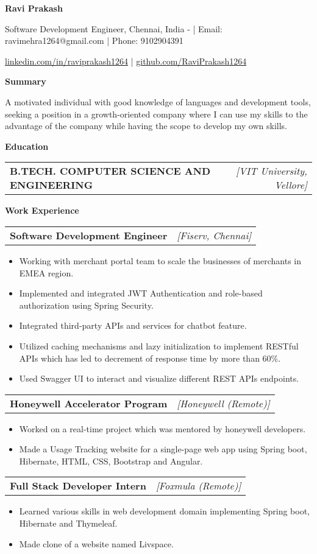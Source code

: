 \documentclass[a4paper,10pt]{article}
\makeatletter
\newcommand{\resitem}[1]{\item #1}
\newcommand{\resheading}[1]{\vspace{0.5em} {\small \colorbox{mygrey}{{\begin{minipage}{0.975\textwidth}{{\textbf{#1}}}\end{minipage}}}} \vspace{0.5em}}
\newcommand{\ressubheading}[3]{\begin{tabular*}{6.62in}{l @{\extracolsep{\fill}} r} \textbf{#1} & \textit{[#2]} \\ \end{tabular*}\vspace{-8pt}}
\makeatother
\begin{document}
\begin{center} \Large{\textbf{Ravi Prakash}} \end{center}

\vspace{2pt}

\begin{center} Software Development Engineer, Chennai, India - | Email: ravimehra1264@gmail.com | Phone: 9102904391 \end{center}
\begin{center} \href{linkedin.com/in/raviprakash1264}{linkedin.com/in/raviprakash1264} | \href{github.com/RaviPrakash1264}{github.com/RaviPrakash1264} \end{center}

\resheading{Summary}
\resitem{A motivated individual with good knowledge of languages and development tools, seeking a position in a growth-oriented company where I can use my skills to the advantage of the company while having the scope to develop my own skills.}

\resheading{Education}
\ressubheading{B.TECH. COMPUTER SCIENCE AND ENGINEERING}{VIT University, Vellore}{07/2018 - 06/2022, 8.45}

\resheading{Work Experience}
\ressubheading{Software Development Engineer}{Fiserv, Chennai}{08/2022 - Present}
\begin{itemize}[nosep]
    \resitem{Working with merchant portal team to scale the businesses of merchants in EMEA region.}
    \resitem{Implemented and integrated JWT Authentication and role-based authorization using Spring Security.}
    \resitem{Integrated third-party APIs and services for chatbot feature.}
    \resitem{Utilized caching mechanisms and lazy initialization to implement RESTful APIs which has led to decrement of response time by more than 60\%.}
    \resitem{Used Swagger UI to interact and visualize different REST APIs endpoints.}
\end{itemize}
\ressubheading{Honeywell Accelerator Program}{Honeywell (Remote)}{08/2020 - 12/2020}
\begin{itemize}[nosep]
    \resitem{Worked on a real-time project which was mentored by honeywell developers.}
    \resitem{Made a Usage Tracking website for a single-page web app using Spring boot, Hibernate, HTML, CSS, Bootstrap and Angular.}
\end{itemize}
\ressubheading{Full Stack Developer Intern}{Foxmula (Remote)}{03/2020 - 05/2020}
\begin{itemize}[nosep]
    \resitem{Learned various skills in web development domain implementing Spring boot, Hibernate and Thymeleaf.}
    \resitem{Made clone of a website named Livspace.}
\end{itemize}
\end{document}
